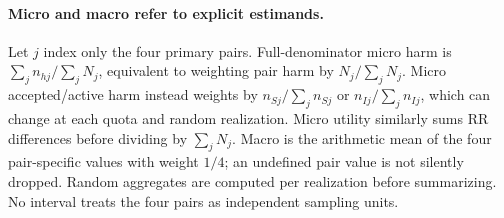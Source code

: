 \documentclass[11pt,a4paper]{article}
\begin{document}
\paragraph{Micro and macro refer to explicit estimands.}
Let $j$ index only the four primary pairs. Full-denominator micro harm is $\sum_j n_{hj}/\sum_j N_j$, equivalent to weighting pair harm by $N_j/\sum_j N_j$. Micro accepted/active harm instead weights by $n_{Sj}/\sum_j n_{Sj}$ or $n_{Ij}/\sum_j n_{Ij}$, which can change at each quota and random realization. Micro utility similarly sums RR differences before dividing by $\sum_jN_j$. Macro is the arithmetic mean of the four pair-specific values with weight $1/4$; an undefined pair value is not silently dropped. Random aggregates are computed per realization before summarizing. No interval treats the four pairs as independent sampling units.
\end{document}
